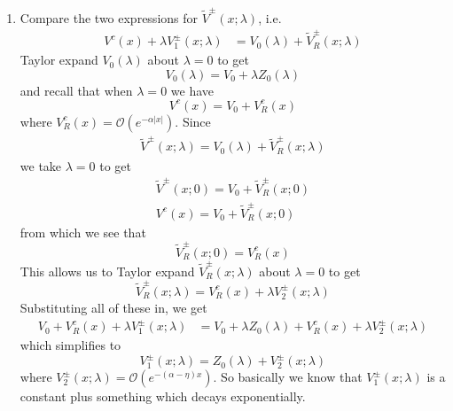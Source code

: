 \documentclass[thesis.tex]{subfiles}
\begin{document}
\begin{enumerate}
\item Compare the two expressions for $\tilde{V}^\pm(x; \lambda)$, i.e. 
\begin{align*}
V^c(x) + \lambda V_1^\pm(x; \lambda) &= V_0(\lambda) + \tilde{V}_R^\pm(x; \lambda)
\end{align*}
Taylor expand $V_0(\lambda)$ about $\lambda = 0$ to get
\[
V_0(\lambda) = V_0 + \lambda Z_0(\lambda)
\]
and recall that when $\lambda = 0$ we have
\[
V^c(x) = V_0 + V^c_R(x)
\]
where $V^c_R(x) = \mathcal{O}(e^{-\alpha |x|})$. Since
\begin{align*}
\tilde{V}^\pm(x; \lambda) = V_0(\lambda) + \tilde{V}_R^\pm(x; \lambda)
\end{align*}
we take $\lambda = 0$ to get
\begin{align*}
\tilde{V}^\pm(x; 0) = V_0 + \tilde{V}_R^\pm(x; 0) \\
V^c(x) = V_0 + \tilde{V}_R^\pm(x; 0) 
\end{align*}
from which we see that
\[
\tilde{V}_R^\pm(x; 0) = V^c_R(x)
\]
This allows us to Taylor expand $\tilde{V}_R^\pm(x; \lambda)$ about $\lambda = 0$ to get
\[
\tilde{V}_R^\pm(x; \lambda) = V^c_R(x) + \lambda V_2^\pm(x; 
\lambda)
\]
Substituting all of these in, we get
\begin{align*}
V_0 + V^c_R(x) + \lambda V_1^\pm(x; \lambda) &= V_0 + \lambda Z_0(\lambda) + V^c_R(x) + \lambda V_2^\pm(x; \lambda) 
\end{align*}
which simplifies to
\begin{equation}\label{V2eq}
V_1^\pm(x; \lambda) = Z_0(\lambda) + V_2^\pm(x; \lambda)
\end{equation}
where $V_2^\pm(x; \lambda) = \mathcal{O}(e^{-(\alpha - \eta)x}) $. So basically we know that $V_1^\pm(x; \lambda)$ is a constant plus something which decays exponentially.


\end{enumerate}
\end{document}
